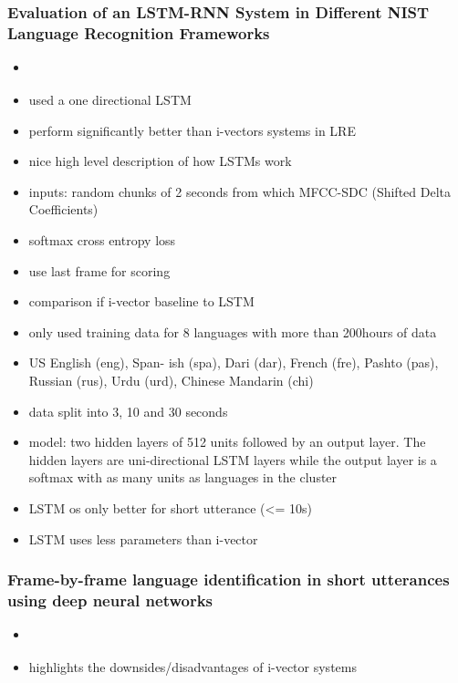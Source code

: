     \subsubsection{Evaluation of an LSTM-RNN System in Different NIST Language Recognition Frameworks}
    \begin{itemize}
        \item \cite{zazo2016evaluation}
        \item used a one directional LSTM
        \item perform significantly better than i-vectors systems in LRE
        \item nice high level description of how LSTMs work
        \item inputs: random chunks of 2 seconds from which MFCC-SDC (Shifted Delta Coefficients) 
        \item softmax cross entropy loss
        \item use last frame for scoring
        \item comparison if i-vector baseline to LSTM
        \item only used training data for 8 languages with more than 200hours of data
        \item US English (eng), Span- ish (spa), Dari (dar), French (fre), Pashto (pas), Russian (rus), Urdu (urd), Chinese Mandarin (chi)
        \item data split into 3, 10 and 30 seconds
        \item model: two hidden layers of 512 units followed by an output layer. The hidden layers are uni-directional LSTM layers while the output layer is a softmax with as many units as languages in the cluster
        \item LSTM os only better for short utterance (<= 10s)
        \item LSTM uses less parameters than i-vector
        
    \end{itemize}
    
    \subsubsection{Frame-by-frame language identification in short utterances using deep neural networks}
    \begin{itemize}
        \item \cite{gonzalez2015frame}
        \item highlights the downsides/disadvantages of i-vector systems
        
    \end{itemize}
    
    